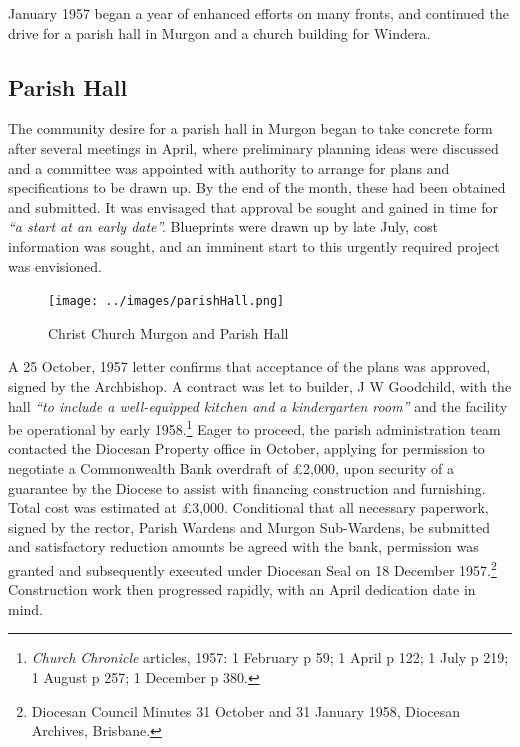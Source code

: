January 1957 began a year of enhanced efforts on many fronts, and continued the drive for a parish hall in Murgon and a church building for Windera.



\subsection{Parish Hall}



The community desire for a parish hall in Murgon began to take concrete form after several meetings in April, where preliminary planning ideas were discussed and a committee was appointed with authority to arrange for plans and specifications to be drawn up. By the end of the month, these had been obtained and submitted. It was envisaged that approval be sought and gained in time for \emph{``a start at an early date''.} Blueprints were drawn up by late July, cost information was sought, and an imminent start to this urgently required project was envisioned.









\begin{figure}[!htb]
\begin{center}
\texttt{[image: ../images/parishHall.png]}
\caption{Christ Church Murgon and Parish Hall}
\end{center}
\end{figure}




A 25 October, 1957 letter confirms that acceptance of the plans was approved, signed by the Archbishop. A contract was let to builder, J W Goodchild, with the hall \emph{``to include a well-equipped kitchen and a kindergarten room''} and the facility be operational by early 1958.\footnote{\emph{Church Chronicle} articles, 1957: 1 February p 59; 1 April p 122; 1 July p 219; 1 August p 257; 1 December p 380.} Eager to proceed, the parish administration team contacted the Diocesan Property office in October, applying for permission to negotiate a Commonwealth Bank overdraft of \pounds2,000, upon security of a guarantee by the Diocese to assist with financing construction and furnishing. Total cost was estimated at \pounds3,000. Conditional that all necessary paperwork, signed by the rector, Parish Wardens and Murgon Sub-Wardens, be submitted and satisfactory reduction amounts be agreed with the bank, permission was granted and subsequently executed under Diocesan Seal on 18 December 1957.\footnote{Diocesan Council Minutes 31 October and 31 January 1958, Diocesan Archives, Brisbane.} Construction work then progressed rapidly, with an April dedication date in mind.


